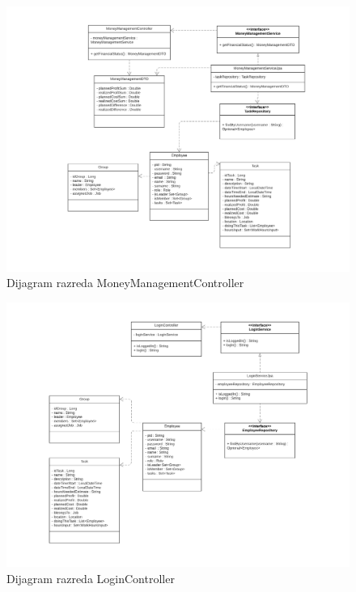 			
			\eject
			\begin{figure}[H]
					\centering
					\includegraphics[width=\textwidth]{slike/UML class - MoneyManagementController.png}
					\caption{Dijagram razreda MoneyManagementController}
				\end{figure}
			
			
			\eject
			\begin{figure}[H]
					\centering
					\includegraphics[width=\textwidth]{slike/UML class - LoginController.png}
					\caption{Dijagram razreda LoginController}
				\end{figure}
			
			
			\eject
			

